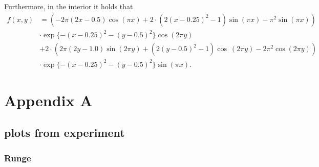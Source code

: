 \documentclass[12pt]{report} %
\begin{document}
Furthermore, in the interior it holds that
\begin{align*}
  f(x,y) &= \left(- 2 \pi \left(2 x - 0.5\right) \cos{\left(\pi x \right)} + 2 \cdot \left
  (2 \left(x - 0.25\right)^{2} - 1\right) \sin{\left(\pi x \right)} - \pi^{2} \sin
  {\left(\pi x \right)}\right) \\ 
  &\cdot \exp\{- \left(x - 0.25\right)^{2} - \left(y - 0.5\right
  )^{2}\} \cos{\left(2 \pi y \right)} \\ &+  2 \cdot \left(2 \pi \left(2 y - 1.0\right) 
  \sin{\left(2 \pi y \right)} + \left(2 \left(y - 0.5\right)^{2} - 1\right) \cos{\
  \left(2 \pi y \right)} - 2 \pi^{2} \cos{\left(2 \pi y \right)}\right) \\
  &\cdot \exp\{- \left
  (x - 0.25\right)^{2} - \left(y - 0.5\right)^{2}\} \sin{\left(\pi x \right)}.
\end{align*}





\clearpage


\printbibliography




\chapter*{Appendix A}\label{appendix-1d}

\section*{plots from experiment}

\subsection*{Runge}
\end{document}
